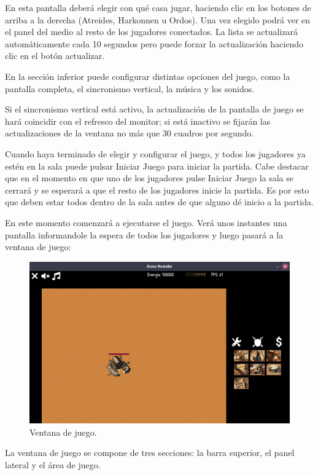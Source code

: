 \documentclass[titlepage,a4paper,12pt]{article}
\begin{document}
En esta pantalla deberá elegir con qué casa jugar, haciendo clic en los botones de arriba a la derecha (Atreides, Harkonnen u Ordos). Una vez elegido podrá ver en el panel del medio al resto de los jugadores conectados. La lista se actualizará automáticamente cada 10 segundos pero puede forzar la actualización haciendo clic en el botón actualizar.

En la sección inferior puede configurar distintas opciones del juego, como la pantalla completa, el sincronismo vertical, la música y los sonidos. 

Si el sincronismo vertical está activo, la actualización de la pantalla de juego se hará coincidir con el refresco del monitor; si está inactivo se fijarán las actualizaciones de la ventana no más que 30 cuadros por segundo.

Cuando haya terminado de elegir y configurar el juego, y todos los jugadores ya estén en la sala puede pulsar Iniciar Juego para iniciar la partida. Cabe destacar que en el momento en que uno de los jugadores pulse Iniciar Juego la sala se cerrará y se esperará a que el resto de los jugadores inicie la partida. Es por esto que deben estar todos dentro de la sala antes de que alguno dé inicio a la partida.

En este momento comenzará a ejecutarse el juego. Verá unos instantes una pantalla informandole la espera de todos los jugadores y luego pasará a la ventana de juego:
\begin{figure}[H]
	\centering
	\includegraphics[width=16cm]{../imagenes/cliente-en-partida.png}
	\caption{\label{fig:cliente-en-partida} Ventana de juego.}
\end{figure}

La ventana de juego se compone de tres secciones: la barra superior, el panel lateral y el área de juego. 
\end{document}
